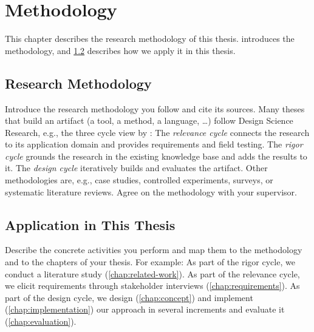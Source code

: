 \chapter{Methodology}\label{chap:methodology}

This chapter describes the research methodology of this thesis.
 introduces the methodology, and \cref{sec:methodology:application} describes how we apply it in this thesis.

\section{Research Methodology}\label{sec:methodology:method}

Introduce the research methodology you follow and cite its sources.
Many theses that build an artifact (a tool, a method, a language, \ldots) follow Design Science Research, e.g., the three cycle view by \textcite{Hevner2007}:
The \emph{relevance cycle} connects the research to its application domain and provides requirements and field testing.
The \emph{rigor cycle} grounds the research in the existing knowledge base and adds the results to it.
The \emph{design cycle} iteratively builds and evaluates the artifact.
Other methodologies are, e.g., case studies, controlled experiments, surveys, or systematic literature reviews.
Agree on the methodology with your supervisor.

\section{Application in This Thesis}\label{sec:methodology:application}

Describe the concrete activities you perform and map them to the methodology and to the chapters of your thesis.
For example:
As part of the rigor cycle, we conduct a literature study (\cref{chap:related-work}).
As part of the relevance cycle, we elicit requirements through stakeholder interviews (\cref{chap:requirements}).
As part of the design cycle, we design (\cref{chap:concept}) and implement (\cref{chap:implementation}) our approach in several increments and evaluate it (\cref{chap:evaluation}).
